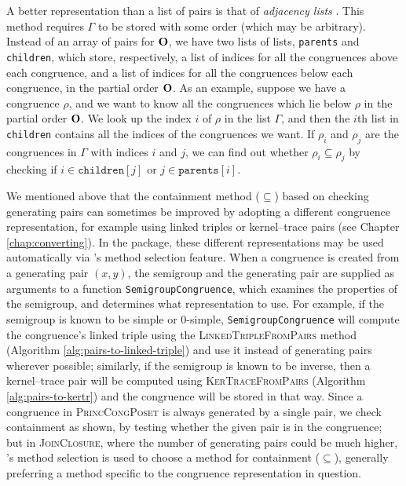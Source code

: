 A better representation than a list of pairs is that of \textit{adjacency lists}
\cite{adj_list}.  This method requires $\Gamma$ to be stored with some
order (which may be arbitrary).  Instead of an array of pairs for $\mathbf{O}$, we have
two lists of lists, \texttt{parents} and \texttt{children}, which store,
respectively, a list of indices for all the congruences above each congruence,
and a list of indices for all the congruences below each congruence, in the
partial order $\mathbf{O}$.  As an example, suppose we have a congruence $\rho$, and we
want to know all the congruences which lie below $\rho$ in the partial order
$\mathbf{O}$.  We look up the index $i$ of $\rho$ in the list $\Gamma$, and then the
$i$th list in \texttt{children} contains all the indices of the congruences we
want.  If $\rho_i$ and $\rho_j$ are the congruences in $\Gamma$ with indices $i$
and $j$, we can find out whether $\rho_i \subseteq \rho_j$ by checking if
$i \in \mathtt{children}[j]$ or $j \in \mathtt{parents}[i]$.

We mentioned above that the containment method ($\subseteq$) based on checking
generating pairs can sometimes be improved by adopting a different congruence
representation, for example using linked triples or kernel--trace pairs (see
Chapter \ref{chap:converting}).  In the \Semigroups{} package, these different
representations may be used automatically via \GAP{}'s method selection feature.
When a congruence is created from a generating pair $(x,y)$, the semigroup and
the generating pair are supplied as arguments to a function
\texttt{SemigroupCongruence}, which examines the properties of the semigroup,
and determines what representation to use.  For example, if the semigroup is
known to be simple or 0-simple, \texttt{SemigroupCongruence} will compute the
congruence's linked triple using the \textsc{LinkedTripleFromPairs} method
(Algorithm \ref{alg:pairs-to-linked-triple}) and use it instead of generating
pairs wherever possible; similarly, if the semigroup is known to be inverse,
then a kernel--trace pair will be computed using \textsc{KerTraceFromPairs}
(Algorithm \ref{alg:pairs-to-kertr}) and the congruence will be stored in that
way.  Since a congruence in \textsc{PrincCongPoset} is always generated by a
single pair, we check containment as shown, by testing whether the given pair is
in the congruence; but in \textsc{JoinClosure}, where the number of generating
pairs could be much higher, \GAP{}'s method selection is used to choose a method
for containment ($\subseteq$), generally preferring a method specific to the
congruence representation in question.

